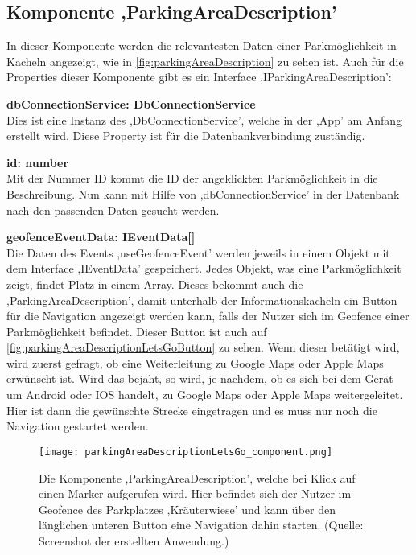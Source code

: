 \subsection{Komponente ,ParkingAreaDescription'}
\label{handleFunctions}
In dieser Komponente werden die relevantesten Daten einer Parkmöglichkeit in Kacheln angezeigt, wie in \autoref{fig:parkingAreaDescription} zu sehen ist. Auch für die Properties dieser Komponente gibt es ein Interface ,IParkingAreaDescription':
\begin{description}
	\item \textbf{dbConnectionService: DbConnectionService} \\ Dies ist eine Instanz des ,DbConnectionService', welche in der ,App' am Anfang erstellt wird. Diese Property ist für die Datenbankverbindung zuständig.
	\item \textbf{id: number} \\ Mit der Nummer ID kommt die ID der angeklickten Parkmöglichkeit in die Beschreibung. Nun kann mit Hilfe von ,dbConnectionService' in der Datenbank nach den passenden Daten gesucht werden.
	\item \textbf{geofenceEventData: IEventData[]} \\ Die Daten des Events ,useGeofenceEvent' werden jeweils in einem Objekt mit dem Interface ,IEventData' gespeichert. Jedes Objekt, was eine Parkmöglichkeit zeigt, findet Platz in einem Array. Dieses bekommt auch die ,ParkingAreaDescription', damit unterhalb der Informationskacheln ein Button für die Navigation angezeigt werden kann, falls der Nutzer sich im Geofence einer Parkmöglichkeit befindet. Dieser Button ist auch auf \autoref{fig:parkingAreaDescriptionLetsGoButton} zu sehen. Wenn dieser betätigt wird, wird zuerst gefragt, ob eine Weiterleitung zu Google Maps oder Apple Maps erwünscht ist. Wird das bejaht, so wird, je nachdem, ob es sich bei dem Gerät um Android oder IOS handelt, zu Google Maps oder Apple Maps weitergeleitet. Hier ist dann die gewünschte Strecke eingetragen und es muss nur noch die Navigation gestartet werden.
	\begin{figure}[h!]
		\centering
		\texttt{[image: parkingAreaDescriptionLetsGo\_component.png]}
		\caption[Die Komponente ,ParkingAreaDescription', welche bei Klick auf einen Marker aufgerufen wird.]
		{Die Komponente ,ParkingAreaDescription', welche bei Klick auf einen Marker aufgerufen wird. Hier befindet sich der Nutzer im Geofence des Parkplatzes ,Kräuterwiese' und kann über den länglichen unteren Button eine Navigation dahin starten. (Quelle: Screenshot der erstellten Anwendung.)}

\end{figure}
\end{description}
